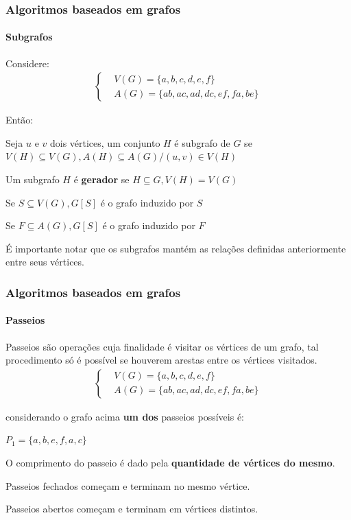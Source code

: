 \begin{frame}
	\frametitle{Algoritmos baseados em grafos}
	\framesubtitle{Subgrafos}
	\par Considere:
	\begin{equation}
		\begin{aligned}
			\begin{cases}
				&V(G) = \{a,b,c,d,e,f\} \\
				&A(G) = \{ab,ac,ad,dc,ef,fa,be\}
			\end{cases}
		\end{aligned}
	\end{equation}
	\par Então:
	\par Seja $u$ e $v$ dois vértices, um conjunto $H$ é subgrafo de $G$ se $V(H) \subseteq V(G), A(H) \subseteq A(G) / (u,v) \in V(H)$
	\par Um subgrafo $H$ é \textbf{gerador} se $H \subseteq G, V(H) = V(G)$
	\par Se $S \subseteq V(G), G[S]$ é o grafo induzido por $S$
	\par Se $F \subseteq A(G), G[S]$ é o grafo induzido por $F$\newline
	\par É importante notar que os subgrafos mantém as relações definidas anteriormente entre seus vértices.
\end{frame}

\begin{frame}
	\frametitle{Algoritmos baseados em grafos}
	\framesubtitle{Passeios}
	\par Passeios são operações cuja finalidade é visitar os vértices de um grafo, tal procedimento só é possível se houverem arestas entre os vértices visitados.
		\begin{equation}
		\begin{aligned}
			\begin{cases}
				&V(G) = \{a,b,c,d,e,f\} \\
				&A(G) = \{ab,ac,ad,dc,ef,fa,be\}
			\end{cases}
		\end{aligned}
	\end{equation}
	\par considerando o grafo acima \textbf{um dos} passeios possíveis é: 
	\par $P_1=\{a,b,e,f,a,c\}$
	\par O comprimento do passeio é dado pela \textbf{quantidade de vértices do mesmo}.
	\par Passeios fechados começam e terminam no mesmo vértice.
	\par Passeios abertos começam e terminam em vértices distintos. 
\end{frame}

